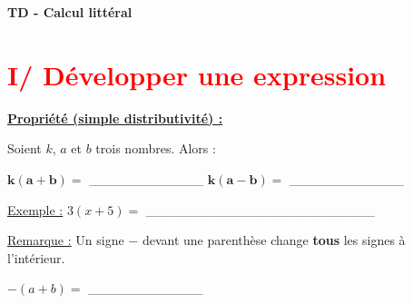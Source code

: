 \documentclass[12pt]{article}
\begin{document}

\begin{center}
    {\LARGE \textbf{TD - Calcul littéral}}\\[4mm]
\end{center}


\section*{\textcolor{red}{I/ Développer une expression}}

\vspace{5pt}
\begin{mdframed}[
    linewidth=1pt,
    roundcorner=5pt,
    linecolor=Red,
    innertopmargin=10pt,
    innerbottommargin=10pt
]
{\color{red}
\textbf{\underline{Propriété (simple distributivité) :}}

\vspace{5pt}
Soient $k$, $a$ et $b$ trois nombres. Alors :

\vspace{10pt}
\begin{center}
    $\bm{k(a+b) = }$ \_\_\_\_\_\_\_\_\_\_\_\_ \hspace{2cm} $\bm{k(a-b) = }$ \_\_\_\_\_\_\_\_\_\_\_\_
\end{center}
}
\end{mdframed}

\vspace{5pt}
\underline{Exemple :} $3(x+5) =$ \_\_\_\_\_\_\_\_\_\_\_\_\_\_\_\_\_\_\_\_\_\_\_\_

\vspace{10pt}
\underline{Remarque :} Un signe $-$ devant une parenthèse change \textbf{tous} les signes à l'intérieur.

\vspace{10pt}
\hspace{1cm}$-(a+b) = $ \_\_\_\_\_\_\_\_\_\_\_\_
\end{document}
